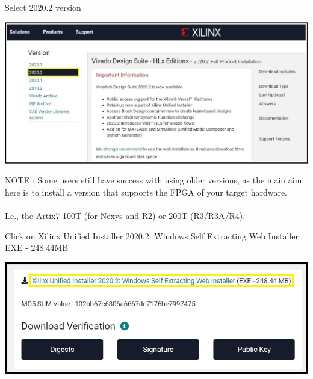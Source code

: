 \begin{minipage}{\linewidth}
  Select 2020.2 version
  \\
  \begin{center}
    \includegraphics[width=\linewidth]{images/VivadoInstimg002.jpg}
  \end{center}
  NOTE : Some users still have success with using older versions, as the main aim here is to install a version that supports the FPGA of your target hardware. \\
  \\
  I.e., the Artix7 100T (for Nexys and R2) or 200T (R3/R3A/R4).
\end{minipage}

\begin{minipage}{\linewidth}
  Click on Xilinx Unified Installer 2020.2: Windows Self Extracting Web Installer EXE - 248.44MB
  \\
  \begin{center}
    \includegraphics[width=0.8\linewidth]{images/VivadoInstimg003.jpg}
  \end{center}
\end{minipage}

